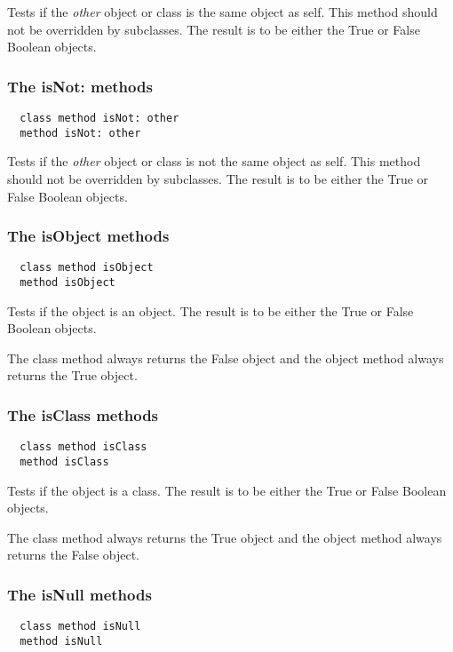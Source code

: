Tests if the \textit{other} object or class is the same object as self. This
method should not be overridden by subclasses. The result is to be either the
True or False Boolean objects.

\hfill
\subsubsection {The isNot: methods}
\begin{lstlisting}
  class method isNot: other
  method isNot: other
\end{lstlisting}

Tests if the \textit{other} object or class is not the same object as self.
This method should not be overridden by subclasses. The result is to be either
the True or False Boolean objects.

\hfill
\subsubsection {The isObject methods}
\begin{lstlisting}
  class method isObject
  method isObject
\end{lstlisting}

Tests if the object is an object. The result is to be either the True or False
Boolean objects.

The class method always returns the False object and the object method always
returns the True object.

\hfill
\subsubsection {The isClass methods}
\begin{lstlisting}
  class method isClass
  method isClass
\end{lstlisting}

Tests if the object is a class. The result is to be either the True or False
Boolean objects.

The class method always returns the True object and the object method always
returns the False object.

\hfill
\subsubsection {The isNull methods}
\begin{lstlisting}
  class method isNull
  method isNull
\end{lstlisting}

